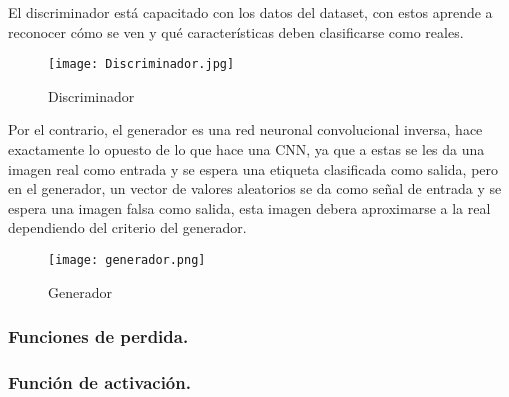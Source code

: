 El discriminador está capacitado con los datos del dataset, con estos aprende a reconocer cómo se ven y qué características deben 
clasificarse como reales.




\begin{figure}[H]
    \begin{center}
      \texttt{[image: Discriminador.jpg]}
      \caption{Discriminador}
      \label{Alexis2}
    \end{center}
\end{figure}


Por el contrario, el generador es una red neuronal convolucional inversa, hace exactamente lo opuesto de lo que hace una CNN, ya que 
a estas se les da una imagen real como entrada y se espera una etiqueta clasificada como salida, 
pero en el generador, un vector de valores aleatorios se da como señal de entrada 
y se espera una imagen falsa como salida, esta imagen debera aproximarse a la real dependiendo del criterio
del generador.



\begin{figure}[H]
    \begin{center}
      \texttt{[image: generador.png]}
      \caption{Generador}
      \label{Alexis3}
    \end{center}
\end{figure}
    
    \subsubsection{Funciones de perdida.}






    
    \subsubsection{Función de activación.}


